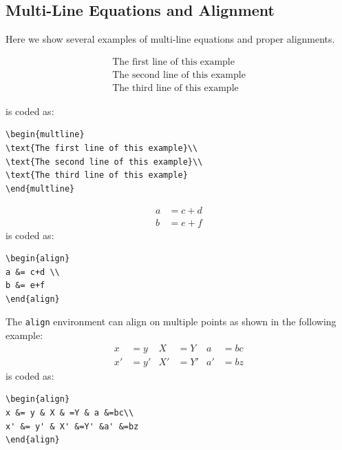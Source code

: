 \documentclass[lettersize,journal]{IEEEtran}
\begin{document}
\subsection{Multi-Line Equations and Alignment}
Here we show several examples of multi-line equations and proper alignments.

\begin{multline}
\text{The first line of this example}\\
\text{The second line of this example}\\
\text{The third line of this example}
\end{multline}

\noindent is coded as:
\begin{verbatim}
\begin{multline}
\text{The first line of this example}\\
\text{The second line of this example}\\
\text{The third line of this example}
\end{multline}
\end{verbatim}

\begin{align}
a &= c+d \\
b &= e+f
\end{align}
\noindent is coded as:
\begin{verbatim}
\begin{align}
a &= c+d \\
b &= e+f
\end{align}
\end{verbatim}

The {\tt{align}} environment can align on multiple  points as shown in the following example:
\begin{align}
x &= y & X & =Y & a &=bc\\
x' &= y' & X' &=Y' &a' &=bz
\end{align}
\noindent is coded as:
\begin{verbatim}
\begin{align}
x &= y & X & =Y & a &=bc\\
x' &= y' & X' &=Y' &a' &=bz
\end{align}
\end{verbatim}
\end{document}
